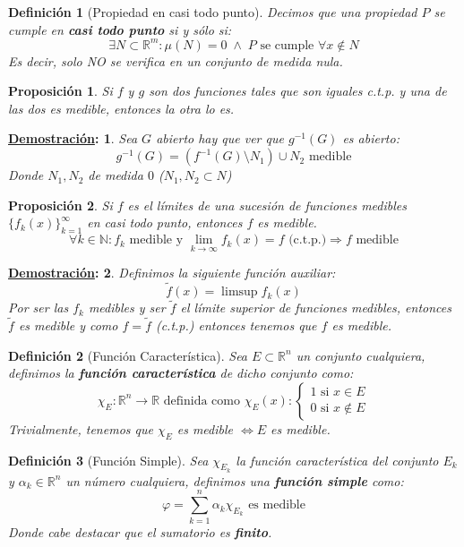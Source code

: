 \documentclass[10pt,a4paper,openright]{book}
\theoremstyle{break}
\newtheorem*{defi}{Definición}
\newtheorem*{prop}{Proposición}
\newtheorem*{demo}{\underline{Demostración}:}
\begin{document}
\begin{defi}[Propiedad en casi todo punto]
Decimos que una propiedad $P$ se cumple en \textbf{casi todo punto} si y sólo si:
$$\exists N \subset \mathbb{R}^m: \mu\left(N\right) = 0\; \land \;P \text{ se cumple } \forall x \not\in N$$
Es decir, solo NO se verifica en un conjunto de medida nula.
\end{defi}

\begin{prop}
Si $f$ y $g$ son dos funciones tales que son iguales c.t.p. y una de las dos es medible, entonces la otra lo es.
\end{prop}
\begin{demo}
Sea $G$ abierto hay que ver que $g^{-1}\left(G\right)$ es abierto:
$$g^{-1}\left(G\right) = \left(f^{-1}\left(G\right) \setminus N_1\right) \cup N_2 \text{ medible}$$
Donde $N_1, N_2$ de medida $0$ ($N_1, N_2 \subset N$)
\end{demo}

\begin{prop}
Si $f$ es el límites de una sucesión de funciones medibles $\{f_k(x)\}_{k=1}^\infty$ en casi todo punto, entonces $f$ es medible.
$$\forall k \in \mathbb{N}: f_k \mbox{ medible y }\lim_{k\rightarrow\infty}f_k(x) = f \mbox{ (c.t.p.)}\Rightarrow f \mbox{ medible}$$
\end{prop}
\begin{demo}
Definimos la siguiente función auxiliar:
$$\tilde{f}\left(x\right) = \limsup f_k\left(x\right)$$
Por ser las $f_k$ medibles y ser $\tilde{f}$ el límite superior de funciones medibles, entonces $\tilde{f}$ es medible y como $f=\tilde{f}$ (c.t.p.) entonces tenemos que $f$ es medible.
\end{demo}

\begin{defi}[Función Característica]
Sea $E\subset \mathbb{R}^n$ un conjunto cualquiera, definimos la \textbf{función característica} de dicho conjunto como:
$$\chi_E: \mathbb{R}^{n} \rightarrow \mathbb{R}\mbox{ definida como } \chi_E \left(x\right) : \begin{cases}
    1 \text{ si } x \in E\\
    0 \text{ si } x \not\in E
\end{cases}$$
Trivialmente, tenemos que $\chi_E$ es medible $\Leftrightarrow E$ es medible.
\end{defi}

\begin{defi}[Función Simple]
Sea $\chi_{E_k}$ la función característica del conjunto $E_k$ y $\alpha_k\in \mathbb{R}^n$ un número cualquiera, definimos una \textbf{función simple} como:
$$\varphi = \sum_{k=1}^{n} \alpha_k \chi_{E_k} \text{ es medible}$$
Donde cabe destacar que el sumatorio es \textbf{finito}.
\end{defi}
\end{document}
